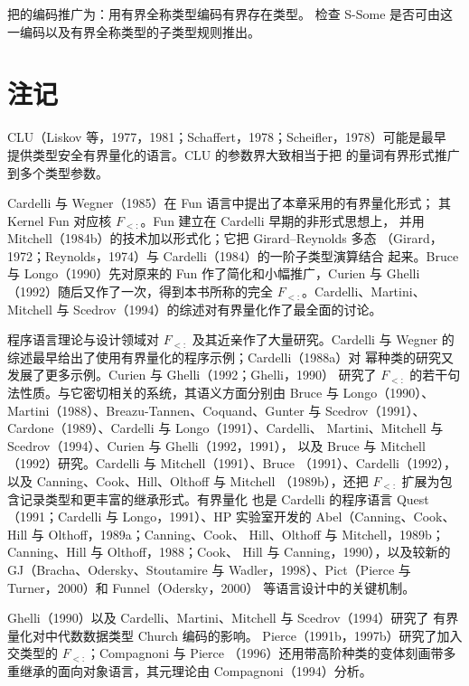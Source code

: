 \begin{exercise}[\(\star\star\)]
\label{ex:26.5.4}
把的编码推广为：用有界全称类型编码有界存在类型。
检查 S-Some 是否可由这一编码以及有界全称类型的子类型规则推出。
\end{exercise}

\section{注记}
\label{sec:26.6}

CLU（Liskov 等，1977，1981；Schaffert，1978；Scheifler，1978）可能是最早
提供类型安全有界量化的语言。CLU 的参数界大致相当于把
的量词有界形式推广到多个类型参数。

Cardelli 与 Wegner（1985）在 Fun 语言中提出了本章采用的有界量化形式；
其 Kernel Fun 对应核 \(F_{<:}\)。Fun 建立在 Cardelli 早期的非形式思想上，
并用 Mitchell（1984b）的技术加以形式化；它把 Girard--Reynolds 多态
（Girard，1972；Reynolds，1974）与 Cardelli（1984）的一阶子类型演算结合
起来。Bruce 与 Longo（1990）先对原来的 Fun 作了简化和小幅推广，Curien 与
Ghelli（1992）随后又作了一次，得到本书所称的完全 \(F_{<:}\)。Cardelli、Martini、
Mitchell 与 Scedrov（1994）的综述对有界量化作了最全面的讨论。

程序语言理论与设计领域对 \(F_{<:}\) 及其近亲作了大量研究。Cardelli 与
Wegner 的综述最早给出了使用有界量化的程序示例；Cardelli（1988a）对
幂种类的研究又发展了更多示例。Curien 与 Ghelli（1992；Ghelli，1990）
研究了 \(F_{<:}\) 的若干句法性质。与它密切相关的系统，其语义方面分别由
Bruce 与 Longo（1990）、Martini（1988）、Breazu-Tannen、Coquand、Gunter
与 Scedrov（1991）、Cardone（1989）、Cardelli 与 Longo（1991）、Cardelli、
Martini、Mitchell 与 Scedrov（1994）、Curien 与 Ghelli（1992，1991），
以及 Bruce 与 Mitchell（1992）研究。Cardelli 与 Mitchell（1991）、Bruce
（1991）、Cardelli（1992），以及 Canning、Cook、Hill、Olthoff 与 Mitchell
（1989b），还把 \(F_{<:}\) 扩展为包含记录类型和更丰富的继承形式。有界量化
也是 Cardelli 的程序语言 Quest（1991；Cardelli 与 Longo，1991）、HP
实验室开发的 Abel（Canning、Cook、Hill 与 Olthoff，1989a；Canning、Cook、
Hill、Olthoff 与 Mitchell，1989b；Canning、Hill 与 Olthoff，1988；Cook、
Hill 与 Canning，1990），以及较新的 GJ（Bracha、Odersky、Stoutamire 与
Wadler，1998）、Pict（Pierce 与 Turner，2000）和 Funnel（Odersky，2000）
等语言设计中的关键机制。

Ghelli（1990）以及 Cardelli、Martini、Mitchell 与 Scedrov（1994）研究了
有界量化对中代数数据类型 Church 编码的影响。
Pierce（1991b，1997b）研究了加入交类型的 \(F_{<:}\)；Compagnoni 与 Pierce
（1996）还用带高阶种类的变体刻画带多重继承的面向对象语言，其元理论由
Compagnoni（1994）分析。

